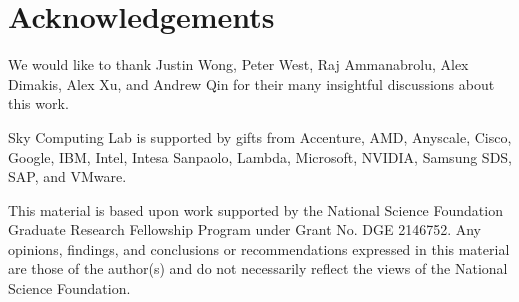 \section*{Acknowledgements}

We would like to thank Justin Wong, Peter West, Raj Ammanabrolu, Alex Dimakis, Alex Xu, and Andrew Qin for their many insightful discussions about this work.

Sky Computing Lab is supported by gifts from Accenture, AMD, Anyscale, Cisco, Google, IBM, Intel, Intesa Sanpaolo, Lambda, Microsoft, NVIDIA, Samsung SDS, SAP, and VMware.

This material is based upon work supported by the National Science Foundation Graduate Research Fellowship Program under Grant No. DGE 2146752. Any opinions, findings, and conclusions or recommendations expressed in this material are those of the author(s) and do not necessarily reflect the views of the National Science Foundation.